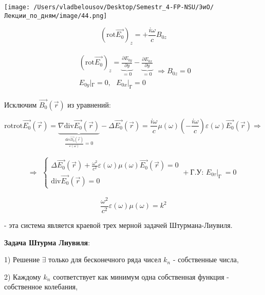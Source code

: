 \documentclass[12pt, a4paper]{report}
\begin{document}
\begin{center}
    \texttt{[image: /Users/vladbelousov/Desktop/Semestr\_4-FP-NSU/ЭиО/Лекции\_по\_дням/image/44.png]}
\end{center}

\[ (\mathrm{rot }  \vec{E_0})_z =  + \frac{i \omega }{c } B_{0z}     \] 

\[ \begin{aligned}
    \begin{array}{l|}
        (\mathrm{rot }  \vec{E_0})_z = \underbrace{\frac{\partial E_{0y } }{\partial  y }}_{=0} - \underbrace{\frac{\partial  E_{0x } }{\partial  y } }_{=0}  \\
        E_{0y } |_{\text{Г} } =0 , \text{ }  E_{0x } |_{\text{Г} } =0 
    \end{array}
    \Rightarrow  B_{0z } = 0
\end{aligned} \] 

Исключим \( \vec{B_0 } (\vec{r } ) \) из уравнений: 

\[ \mathrm{rot } \mathrm{rot } \vec{E_0 }( \vec{r }  ) = \underbrace{\nabla \mathrm{div } \vec{E_0 }(\vec{r } )}_{\frac{\mathrm{div } \vec{D_0 }(\vec{r } )}  {\varepsilon(\omega)} = 0} - \Delta \vec{E_0 } (\vec{r } )  = \frac{i \omega }{c} \mu (\omega )\left( -\frac{ i \omega}{c}  \right) \varepsilon(\omega ) \vec{E_0 }(\vec{r } )   \Rightarrow   \] 

\[  \Rightarrow \begin{aligned}
    \begin{cases}
        \displaystyle \Delta \vec{E_0 }(\vec{r } ) + \frac{ \omega ^2 }{c ^2 }\varepsilon( \omega ) \mu (\omega ) \vec{E_0 }(\vec{r } ) = 0 \\
        \displaystyle \mathrm{div } \vec{E_0 }(\vec{r } ) = 0 
    \end{cases} 
    + \text{Г.У: } E_{0 \tau} |_{\text{Г } }  = 0 
\end{aligned}  \] 

\[ \frac{ \omega ^2 }{c ^2 }\varepsilon( \omega ) \mu (\omega ) = k ^2  \] 

- эта система является краевой трех мерной задачей Штурмана-Лиувиля.

\textbf{Задача Штурма Лиувиля}: 

1) Решение \( \exists    \)  только для бесконечного ряда чисел \( k_n \) - собственные числа, 

2) Каждому \( k_n \) соответствует как минимум одна собственная функция - собственное колебания, 
\end{document}
